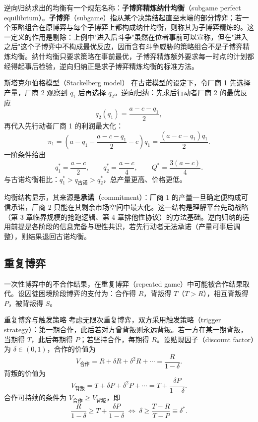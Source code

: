 逆向归纳求出的均衡有一个规范名称：\textbf{子博弈精炼纳什均衡}（subgame perfect equilibrium）。\textbf{子博弈}（subgame）指从某个决策结起直至末端的部分博弈；若一个策略组合在原博弈与每个子博弈上都构成纳什均衡，则称其为子博弈精炼的。这一定义的作用是剔除：上例中"进入后斗争"虽然在位者事前可以宣称，但在"进入之后"这个子博弈中不构成最优反应，因而含有斗争威胁的策略组合不是子博弈精炼均衡。纳什均衡只要求策略在事前最优，子博弈精炼额外要求每一时点的计划都经得起事后检验，逆向归纳正是求子博弈精炼均衡的标准方法。

\begin{derivation}{斯塔克尔伯格模型（Stackelberg model）}{}
在古诺模型的设定下，令厂商 1 先选择产量，厂商 2 观察到 $q_1$ 后再选择 $q_2$。逆向归纳：先求后行动者厂商 2 的最优反应
\[
q_2(q_1) = \frac{a - c - q_1}{2},
\]
再代入先行动者厂商 1 的利润最大化：
\[
\pi_1 = \left(a - q_1 - \frac{a-c-q_1}{2} - c\right) q_1 = \frac{(a-c-q_1)q_1}{2}.
\]
一阶条件给出
\[
q_1^* = \frac{a-c}{2}, \qquad q_2^* = \frac{a-c}{4}, \qquad Q^* = \frac{3(a-c)}{4}.
\]
与古诺均衡相比：$q_1^* > q_{\text{古诺}} > q_2^*$，总产量更高、价格更低。
\end{derivation}

均衡结构显示，其来源是\textbf{承诺}（commitment）：厂商 1 的产量一旦确定便构成可信承诺，厂商 2 只能在其剩余市场空间中最大化。这一结构是理解平台先动战略（第 3 章临界规模的抢跑逻辑、第 4 章排他性协议）的方法基础。逆向归纳的适用前提是各阶段的信息完备与理性共识，若先行动者无法承诺（产量可事后调整），则结果退回古诺均衡。

\subsection{重复博弈}

一次性博弈中的不合作结果，在重复博弈（repeated game）中可能被合作结果取代。设囚徒困境阶段博弈的支付为：合作得 $R$，背叛得 $T$（$T>R$），相互背叛得 $P$，被背叛得 $S$。

\begin{derivation}{重复博弈与触发策略}{}
考虑无限次重复博弈，双方采用触发策略（trigger strategy）：第一期合作，此后若对方曾背叛则永远背叛。若一方在某一期背叛，当期得 $T$，此后每期得 $P$；若坚持合作，每期得 $R$。设贴现因子（discount factor）为 $\delta \in (0,1)$，合作的价值为
\[
V_{\text{合作}} = R + \delta R + \delta^2 R + \cdots = \frac{R}{1-\delta}.
\]
背叛的价值为
\[
V_{\text{背叛}} = T + \delta P + \delta^2 P + \cdots = T + \frac{\delta P}{1-\delta}.
\]
合作可持续的条件为 $V_{\text{合作}} \geq V_{\text{背叛}}$，即
\[
\frac{R}{1-\delta} \geq T + \frac{\delta P}{1-\delta}
\;\Longleftrightarrow\;
\delta \geq \frac{T - R}{T - P} \equiv \delta^*.
\]
\end{derivation}


